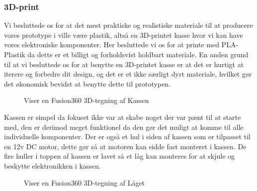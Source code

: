 \documentclass[11pt]{article}
\begin{document}
\subsubsection{3D-print}
Vi besluttede os for at det mest praktiske og realistiske materiale til at producere vores prototype i ville være plastik, altså en 3D-printet kasse hvor vi kan have vores elektroniske komponenter. Her besluttede vi os for at printe med PLA-Plastik da dette er et billigt og forholdsvist holdbart materiale. En anden grund til at vi besluttede os for at benytte en 3D-printet kasse er at det er hurtigt at iterere og forbedre dit design, og det er et ikke særligt dyrt materiale, hvilket gør det økonomisk bevidst at benytte dette til prototypen.
\begin{figure}[htbp]
    \centering
    \caption{Viser en Fusion360 3D-tegning af Kassen}
    \end{figure}
Kassen er simpel da fokuset ikke var at skabe noget der var pænt til at starte med, den er derimod meget funktionel da den gør det muligt at komme til alle individuelle komponenter. Der er også et hul i siden af kassen som er tilpasset til en 12v DC motor, dette gør så at motoren kan sidde fast monteret i kassen. De fire huller i toppen af kassen er lavet så et låg kan monteres for at skjule og beskytte elektronikken i kassen.

\begin{figure}[htbp]
    \centering
    \caption{Viser en Fusion360 3D-tegning af Låget}
    \end{figure}
\end{document}
